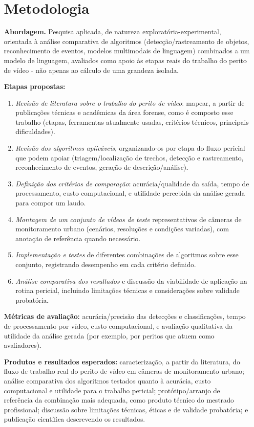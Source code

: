 \section*{Metodologia}

\textbf{Abordagem.} Pesquisa aplicada, de natureza exploratória-experimental, orientada à análise comparativa de algoritmos (detecção/rastreamento de objetos, reconhecimento de eventos, modelos multimodais de linguagem) combinados a um modelo de linguagem, avaliados como apoio às etapas reais do trabalho do perito de vídeo - não apenas ao cálculo de uma grandeza isolada.

\textbf{Etapas propostas:}

\begin{enumerate}[leftmargin=1.5em]
    \item \textit{Revisão de literatura sobre o trabalho do perito de vídeo}: mapear, a partir de publicações técnicas e acadêmicas da área forense, como é composto esse trabalho (etapas, ferramentas atualmente usadas, critérios técnicos, principais dificuldades).
    \item \textit{Revisão dos algoritmos aplicáveis}, organizando-os por etapa do fluxo pericial que podem apoiar (triagem/localização de trechos, detecção e rastreamento, reconhecimento de eventos, geração de descrição/análise).
    \item \textit{Definição dos critérios de comparação}: acurácia/qualidade da saída, tempo de processamento, custo computacional, e utilidade percebida da análise gerada para compor um laudo.
    \item \textit{Montagem de um conjunto de vídeos de teste} representativos de câmeras de monitoramento urbano (cenários, resoluções e condições variadas), com anotação de referência quando necessário.
    \item \textit{Implementação e testes} de diferentes combinações de algoritmos sobre esse conjunto, registrando desempenho em cada critério definido.
    \item \textit{Análise comparativa dos resultados} e discussão da viabilidade de aplicação na rotina pericial, incluindo limitações técnicas e considerações sobre validade probatória.
\end{enumerate}

\textbf{Métricas de avaliação:} acurácia/precisão das detecções e classificações, tempo de processamento por vídeo, custo computacional, e avaliação qualitativa da utilidade da análise gerada (por exemplo, por peritos que atuem como avaliadores).

\textbf{Produtos e resultados esperados:} caracterização, a partir da literatura, do fluxo de trabalho real do perito de vídeo em câmeras de monitoramento urbano; análise comparativa dos algoritmos testados quanto à acurácia, custo computacional e utilidade para o trabalho pericial; protótipo/arranjo de referência da combinação mais adequada, como produto técnico do mestrado profissional; discussão sobre limitações técnicas, éticas e de validade probatória; e publicação científica descrevendo os resultados.
